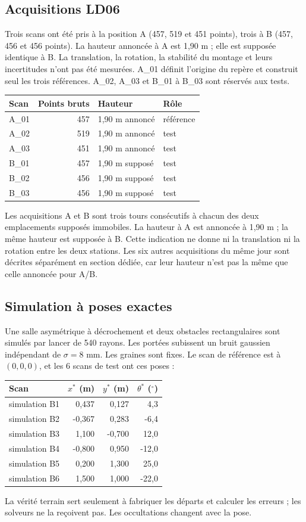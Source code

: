\documentclass[11pt,a4paper]{article}
\begin{document}
\subsection{Acquisitions LD06}
Trois scans ont été pris à la position A (457, 519 et 451 points), trois à B
(457, 456 et 456 points). La hauteur annoncée à A est 1,90 m ; elle est
supposée identique à B. La translation, la rotation, la stabilité du montage
et leurs incertitudes n'ont pas été mesurées. A\_01 définit l'origine du repère
et construit seul les trois références. A\_02, A\_03 et B\_01 à B\_03 sont
réservés aux tests.
\begin{center}\small
\begin{tabular}{lrll}\toprule
Scan & Points bruts & Hauteur & Rôle\\\midrule
A\_01 & 457 & 1,90 m annoncé & référence \\
A\_02 & 519 & 1,90 m annoncé & test \\
A\_03 & 451 & 1,90 m annoncé & test \\
B\_01 & 457 & 1,90 m supposé & test \\
B\_02 & 456 & 1,90 m supposé & test \\
B\_03 & 456 & 1,90 m supposé & test \\
\bottomrule\end{tabular}
\end{center}
Les acquisitions A et B sont trois tours consécutifs à chacun des deux
emplacements supposés immobiles. La hauteur à A est annoncée à 1,90 m ;
la même hauteur est supposée à B. Cette indication ne donne ni la
translation ni la rotation entre les deux stations. Les six autres
acquisitions du même jour sont décrites séparément en section dédiée,
car leur hauteur n'est pas la même que celle annoncée pour A/B.

\subsection{Simulation à poses exactes}
Une salle asymétrique à décrochement et deux obstacles rectangulaires sont
simulés par lancer de 540 rayons. Les portées subissent un bruit gaussien
indépendant de $\sigma=8$ mm. Les graines sont fixes. Le scan de référence
est à $(0,0,0)$, et les 6 scans de test ont ces poses :
\begin{center}\small
\begin{tabular}{lrrr}\toprule Scan & $x^*$ (m) & $y^*$ (m) & $\theta^*$ ($^\circ$)\\
\midrule
simulation B1 & 0,437 & 0,127 & 4,3 \\
simulation B2 & -0,367 & 0,283 & -6,4 \\
simulation B3 & 1,100 & -0,700 & 12,0 \\
simulation B4 & -0,800 & 0,950 & -12,0 \\
simulation B5 & 0,200 & 1,300 & 25,0 \\
simulation B6 & 1,500 & 1,000 & -22,0 \\
\bottomrule\end{tabular}
\end{center}
La vérité terrain sert seulement à fabriquer les départs et calculer les erreurs ;
les solveurs ne la reçoivent pas. Les occultations changent avec la pose.
\end{document}
